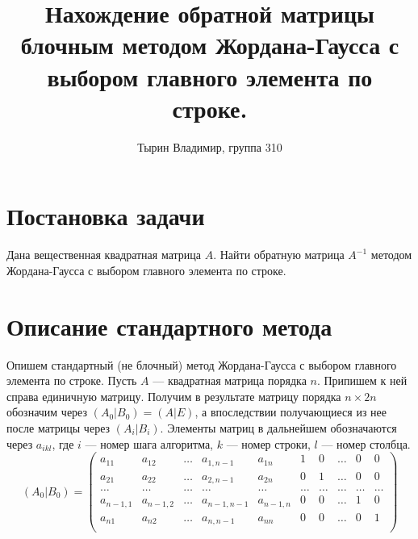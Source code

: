 \documentclass{article}
\title{Нахождение обратной матрицы блочным методом Жордана-Гаусса с выбором главного элемента по строке.}
\author{Тырин Владимир, группа 310}
\date{}
\begin{document}
\maketitle

\section{Постановка задачи}
Дана вещественная квадратная матрица $A$. Найти обратную матрица $A^{-1}$ методом Жордана-Гаусса с выбором главного элемента по строке.

\section{Описание стандартного метода}

Опишем стандартный (не блочный) метод Жордана-Гаусса с выбором главного элемента по строке.
Пусть $A$ --- квадратная матрица порядка $n$. Припишем к ней справа единичную матрицу. Получим в результате матрицу порядка $n\times 2n$ обозначим через $(A_0|B_0) = (A|E)$, а впоследствии получающиеся из нее после матрицы через $(A_i|B_i)$. Элементы матриц в дальнейшем обозначаются через $a_{ikl}$, где $i$ --- номер шага алгоритма, $k$ --- номер строки, $l$ --- номер столбца.
\[ 
(A_0|B_0) = \left( 
\begin{array} {rrrrr|rrrrr}
a_{11} & a_{12} & \ldots & a_{1,n-1} & a_{1n} & 1 & 0 & \ldots & 0 & 0 \\ 
a_{21} & a_{22} & \ldots & a_{2,n-1} & a_{2n} & 0 & 1 & \ldots & 0 & 0 \\ 
\ldots & \ldots & \ldots & \ldots & \ldots & \ldots & \ldots & \ldots & \ldots & \ldots \\ 
a_{n-1,1} & a_{n-1,2} & \ldots & a_{n-1,n-1} & a_{n-1,n} & 0 & 0 & \ldots & 1 & 0 \\
a_{n1} & a_{n2} & \ldots & a_{n,n-1} & a_{nn} & 0 & 0 & \ldots & 0 & 1 \\ 
\end{array} 
\right) 
\]
\end{document}
